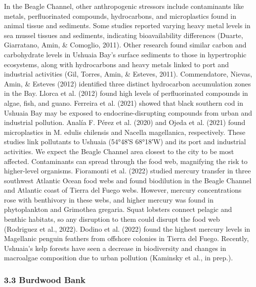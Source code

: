\documentclass[
]{article}
\begin{document}
In the Beagle Channel, other anthropogenic stressors include
contaminants like metals, perfluorinated compounds, hydrocarbons, and
microplastics found in animal tissue and sediments. Some studies
reported varying heavy metal levels in sea mussel tissues and sediments,
indicating bioavailability differences (Duarte, Giarratano, Amin, \&
Comoglio, 2011). Other research found similar carbon and carbohydrate
levels in Ushuaia Bay's surface sediments to those in hypertrophic
ecosystems, along with hydrocarbons and heavy metals linked to port and
industrial activities (Gil, Torres, Amin, \& Esteves, 2011).
Commendatore, Nievas, Amin, \& Esteves (2012) identified three distinct
hydrocarbon accumulation zones in the Bay. Llorca et al. (2012) found
high levels of perfluorinated compounds in algae, fish, and guano.
Ferreira et al. (2021) showed that black southern cod in Ushuaia Bay may
be exposed to endocrine-disrupting compounds from urban and industrial
pollution. Analía F. Pérez et al. (2020) and Ojeda et al. (2021) found
microplastics in M. edulis chilensis and Nacella magellanica,
respectively. These studies link pollutants to Ushuaia (54°48′S 68°18′W)
and its port and industrial activities. We expect the Beagle Channel
area closest to the city to be most affected. Contaminants can spread
through the food web, magnifying the risk to higher-level organisms.
Fioramonti et al. (2022) studied mercury transfer in three southwest
Atlantic Ocean food webs and found biodilution in the Beagle Channel and
Atlantic coast of Tierra del Fuego webs. However, mercury concentrations
rose with benthivory in these webs, and higher mercury was found in
phytoplankton and Grimothea gregaria. Squat lobsters connect pelagic and
benthic habitats, so any disruption to them could disrupt the food web
(Rodriguez et al., 2022). Dodino et al. (2022) found the highest mercury
levels in Magellanic penguin feathers from offshore colonies in Tierra
del Fuego. Recently, Ushuaia's kelp forests have seen a decrease in
biodiversity and changes in macroalgae composition due to urban
pollution (Kaminsky et al., in prep.).

\hypertarget{burdwood-bank}{%
\subsubsection{3.3 Burdwood Bank}\label{burdwood-bank}}
\end{document}
